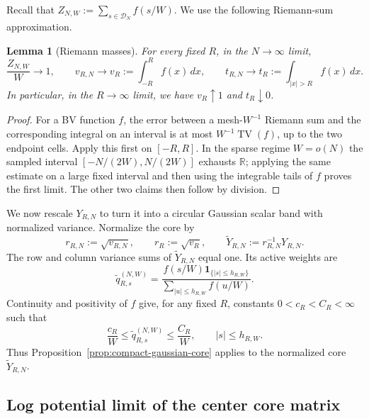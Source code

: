 \documentclass[11pt,reqno]{amsart}
\numberwithin{equation}{section}
\newtheorem{lemma}[theorem]{Lemma}
\theoremstyle{definition}
\theoremstyle{remark}
\newcommand{\R}{\mathbb R}
\newcommand{\1}{\mathbf 1}
\DeclareMathOperator{\TV}{TV}
\begin{document}
Recall that
\(Z_{N,W}:=\sum_{s\in\mathcal D_N}f(s/W)\).  We use the following
Riemann-sum approximation.
\begin{lemma}[Riemann masses]\label{lem:Riemann-masses}
For every fixed $R$, in the $N\to\infty$ limit,
\begin{equation}\label{eq:Riemann-mass-limits}
 \frac{Z_{N,W}}W\longrightarrow1,\qquad
 v_{R,N}\longrightarrow v_R:=\int_{-R}^R f(x)\,dx,\qquad
 t_{R,N}\longrightarrow t_R:=\int_{|x|>R}f(x)\,dx.
\end{equation}
In particular, in the $R\to\infty$ limit, we have $v_R\uparrow1$ and $t_R\downarrow0$.
\end{lemma}

\begin{proof}
For a BV function $f$, the error between a mesh-$W^{-1}$ Riemann sum and the
corresponding integral on an interval is at most
$W^{-1}\TV(f)$, up to the two endpoint cells.  Apply this first on
$[-R,R]$.  In the sparse regime $W=o(N)$ the sampled interval
$[-N/(2W),N/(2W)]$ exhausts $\R$; applying the same estimate on a large
fixed interval and then using the integrable tails of $f$ proves the first
limit.  The other two claims then follow by division.
\end{proof}

We now rescale $Y_{R,N}$ to turn it into a circular Gaussian scalar band with normalized variance. Normalize the core by
\begin{equation}\label{eq:normalized-core}
 r_{R,N}:=\sqrt{v_{R,N}},\qquad r_R:=\sqrt{v_R},\qquad
 \widetilde Y_{R,N}:=r_{R,N}^{-1}Y_{R,N}.
\end{equation}
The row and column variance sums of $\widetilde Y_{R,N}$ equal one.  Its
active weights are
\[
 \widetilde q_{R,s}^{(N,W)}
 =\frac{f(s/W)\1_{\{|s|\le h_{R,W}\}}}
 {\sum_{|u|\le h_{R,W}}f(u/W)}.
\]
Continuity and positivity of $f$ give, for any fixed $R$, constants $0<c_R<C_R<\infty$ such that
\begin{equation}\label{eq:normalized-core-comparability}
 \frac{c_R}{W}\le\widetilde q_{R,s}^{(N,W)}
 \le\frac{C_R}{W},\qquad |s|\le h_{R,W}.
\end{equation}
Thus Proposition~\ref{prop:compact-gaussian-core} applies to the normalized
core $\widetilde Y_{R,N}$.

\subsection{Log potential limit of the center core matrix}
\end{document}
